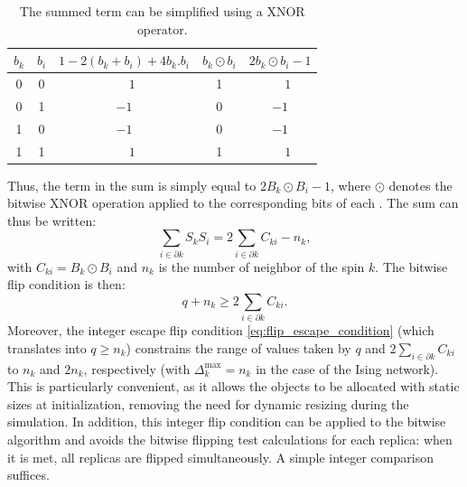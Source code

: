 \nolinenumbers
\begin{table}[h]
\centering
\begin{tabular}{cc||c|c|c}
\hline
$b_k$ & $b_i$ & $1- 2 (b_k+b_i) +4 b_k.b_i$ &  ${b_k \odot b_i}$ & $2{b_k \odot b_i} -1 $ \\
\hline
0 & 0 & $ \phantom{-}1$ & 1 & $\phantom{-}1$ \\
0 & 1 & $-1$ & 0  & $-1$ \\
1 & 0 & $-1$ & 0 &  $-1$ \\
1 & 1 & $\phantom{-}1$ & 1 & $\phantom{-}1$\\
\hline
\end{tabular}
\caption{The summed term can be simplified using a XNOR operator.}
\label{tab:XNOR}
\end{table}
\linenumbers

Thus, the term in the sum is simply equal to $2{B_k \odot B_i} -1 $, where $\odot$ denotes the bitwise XNOR operation applied to the corresponding bits of each \Bits. The sum can thus be written:
\begin{equation*}
  \sum_{i \in \partial k}S_k S_i=2\sum_{i \in \partial k} C_{ki} - n_k,
\end{equation*}
with $C_{ki}={B_k \odot B_i}$ and $n_k$ is the number of neighbor of the spin $k$. The bitwise flip condition is then:
\begin{equation}
 q+ n_k \geq 2 \sum_{i \in \partial k}C_{ki}.
  \label{eq:flip_ising_bitwise}
\end{equation}
 Moreover, the integer escape flip condition \eqref{eq:flip_escape_condition} (which translates into $q \geq n_k$) constrains the range of values taken by $q$ and $ 2 \sum_{i \in \partial k}C_{ki}$ to $n_k$ and $2n_k$, respectively (with $\Delta_k^\text{max} = n_k$ in the case of the Ising network). This is particularly convenient, as it allows the \UnsignedInt objects to be allocated with static sizes at initialization, removing the need for dynamic resizing during the simulation.
 In addition, this integer flip condition can be applied to the bitwise algorithm and avoids the bitwise flipping test calculations for each replica: when it is met, all replicas are flipped simultaneously. A simple integer comparison suffices.\\

